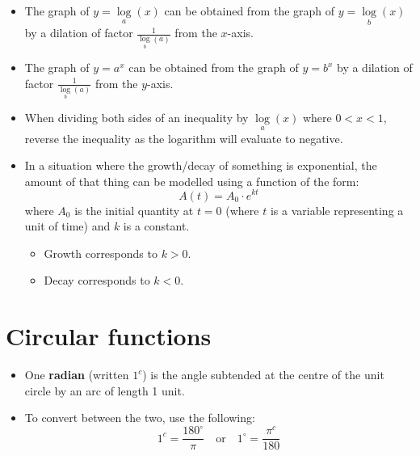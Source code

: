 \documentclass[12pt,a4paper,titlepage]{article}
\begin{document}
\begin{SummaryBox}[title=Logarithms]
                \begin{itemize}[leftmargin=*]
                    \item The graph of $y=\log\limits_a (x)$ can be obtained from the graph of $y=\log\limits_b (x)$ by a dilation of factor $\frac{1}{\log\limits_b (a)}$ from the $x$-axis.
                    \item The graph of $y=a^x$ can be obtained from the graph of $y=b^x$ by a dilation of factor $\frac{1}{\log\limits_b (a)}$ from the $y$-axis.
                    \item When dividing both sides of an inequality by $\log\limits_a (x)$ where $0<x<1$, reverse the inequality as the logarithm will evaluate to negative.
                \end{itemize}
            \end{SummaryBox}
            
            \begin{SummaryBox}[title=Exponential growth and decay]
                \begin{itemize}[leftmargin=*]
                    \item In a situation where the growth/decay of something is exponential, the amount of that thing can be modelled using a function of the form:
                    \[
                        A(t) = A_0 \cdot e^{kt}
                    \]
                    where $A_0$ is the initial quantity at $t=0$ (where $t$ is a variable representing a unit of time) and $k$ is a constant.
                    \begin{itemize}[topsep=0pt]
                        \item Growth corresponds to $k>0$.
                        \item Decay corresponds to $k<0$.
                    \end{itemize}
                \end{itemize}
            \end{SummaryBox}
            
            \pagebreak
            
        \section{Circular functions}
            
            \begin{SummaryBox}[title=Radians and degrees]
                \begin{itemize}[leftmargin=*]
                    \item One \textbf{radian} (written $1^c$) is the angle subtended at the centre of the unit circle by an arc of length 1 unit.
                    \item To convert between the two, use the following:
                    \[
                        1^c = \frac{180^\circ}{\pi} \quad \text{or} \quad 1^\circ = \frac{\pi^c}{180}
                    \]
                \end{itemize}
            \end{SummaryBox}
            
\end{document}
